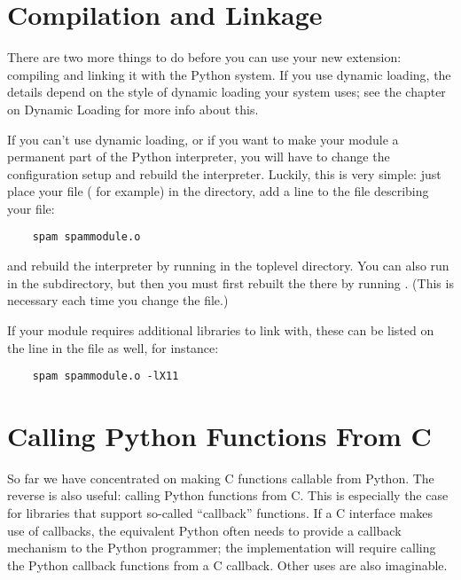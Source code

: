 \section{Compilation and Linkage}

There are two more things to do before you can use your new extension:
compiling and linking it with the Python system.  If you use dynamic
loading, the details depend on the style of dynamic loading your
system uses; see the chapter on Dynamic Loading for more info about
this.

If you can't use dynamic loading, or if you want to make your module a
permanent part of the Python interpreter, you will have to change the
configuration setup and rebuild the interpreter.  Luckily, this is
very simple: just place your file ( for example) in
the  directory, add a line to the file
 describing your file:

\begin{verbatim}
    spam spammodule.o
\end{verbatim}

and rebuild the interpreter by running  in the toplevel
directory.  You can also run  in the 
subdirectory, but then you must first rebuilt the 
there by running .  (This is necessary each time
you change the  file.)

If your module requires additional libraries to link with, these can
be listed on the line in the  file as well, for instance:

\begin{verbatim}
    spam spammodule.o -lX11
\end{verbatim}


\section{Calling Python Functions From C}

So far we have concentrated on making C functions callable from
Python.  The reverse is also useful: calling Python functions from C.
This is especially the case for libraries that support so-called
``callback'' functions.  If a C interface makes use of callbacks, the
equivalent Python often needs to provide a callback mechanism to the
Python programmer; the implementation will require calling the Python
callback functions from a C callback.  Other uses are also imaginable.

